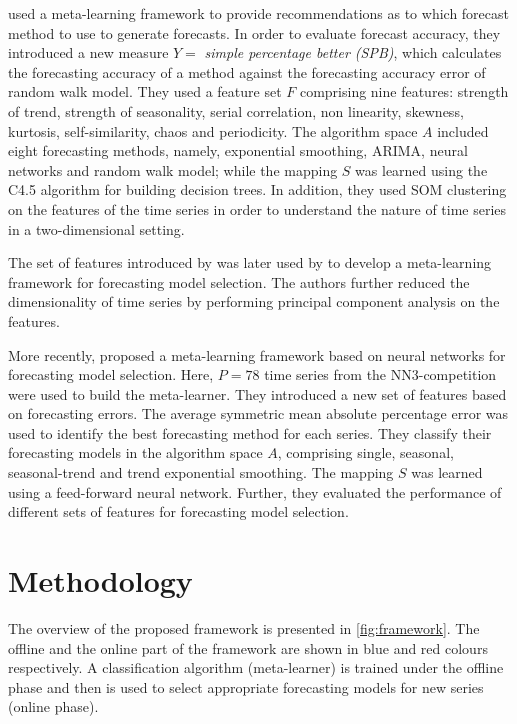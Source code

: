 \documentclass[11pt,a4paper,]{article}
\theoremstyle{definition}
\theoremstyle{definition}
\theoremstyle{definition}
\theoremstyle{remark}
\begin{document}
\textcite{wang2009rule} used a meta-learning framework to provide
recommendations as to which forecast method to use to generate
forecasts. In order to evaluate forecast accuracy, they introduced a new
measure \(Y =\) \emph{simple percentage better (SPB)}, which calculates
the forecasting accuracy of a method against the forecasting accuracy
error of random walk model. They used a feature set \(F\) comprising
nine features: strength of trend, strength of seasonality, serial
correlation, non linearity, skewness, kurtosis, self-similarity, chaos
and periodicity. The algorithm space \(A\) included eight forecasting
methods, namely, exponential smoothing, ARIMA, neural networks and
random walk model; while the mapping \(S\) was learned using the C4.5
algorithm for building decision trees. In addition, they used SOM
clustering on the features of the time series in order to understand the
nature of time series in a two-dimensional setting.

The set of features introduced by \textcite{wang2009rule} was later used
by \textcite{widodomodel} to develop a meta-learning framework for
forecasting model selection. The authors further reduced the
dimensionality of time series by performing principal component analysis
on the features.

More recently, \textcite{kuck2016meta} proposed a meta-learning
framework based on neural networks for forecasting model selection.
Here, \(P = 78\) time series from the NN3-competition were used to build
the meta-learner. They introduced a new set of features based on
forecasting errors. The average symmetric mean absolute percentage error
was used to identify the best forecasting method for each series. They
classify their forecasting models in the algorithm space \(A\),
comprising single, seasonal, seasonal-trend and trend exponential
smoothing. The mapping \(S\) was learned using a feed-forward neural
network. Further, they evaluated the performance of different sets of
features for forecasting model selection.

\section{Methodology}\label{methodology}

The overview of the proposed framework is presented in
\autoref{fig:framework}. The offline and the online part of the
framework are shown in blue and red colours respectively. A
classification algorithm (meta-learner) is trained under the offline
phase and then is used to select appropriate forecasting models for new
series (online phase).
\end{document}
